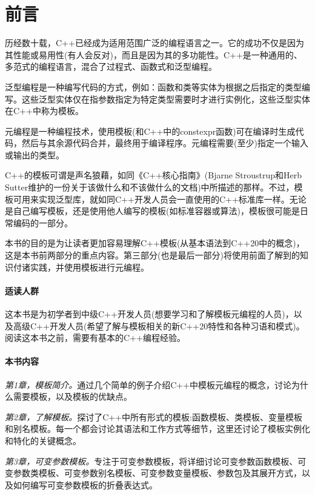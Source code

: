 \chapter{前言}

历经数十载，C++已经成为适用范围广泛的编程语言之一。它的成功不仅是因为其性能或易用性(有人会反对)，而且是因为其的多功能性。C++是一种通用的、多范式的编程语言，混合了过程式、函数式和泛型编程。

泛型编程是一种编写代码的方式，例如：函数和类等实体为根据之后指定的类型编写。这些泛型实体仅在指参数指定为特定类型需要时才进行实例化，这些泛型实体在C++中称为模板。

元编程是一种编程技术，使用模板(和C++中的constexpr函数)可在编译时生成代码，然后与其余源代码合并，最终用于编译程序。元编程需要(至少)指定一个输入或输出的类型。

C++的模板可谓是声名狼藉，如同《C++核心指南》(Bjarne Stroustrup和Herb Sutter维护的一份关于该做什么和不该做什么的文档)中所描述的那样。不过，模板可用来实现泛型库，就如同C++开发人员会一直使用的C++标准库一样。无论是自己编写模板，还是使用他人编写的模板(如标准容器或算法)，模板很可能是日常编码的一部分。

本书的目的是为让读者更加容易理解C++模板(从基本语法到C++20中的概念)，这是本书前两部分的重点内容。第三部分(也是最后一部分)将使用前面了解到的知识付诸实践，并使用模板进行元编程。

\subsubsection{适读人群}

这本书是为初学者到中级C++开发人员(想要学习和了解模板元编程的人员)，以及高级C++开发人员(希望了解与模板相关的新C++20特性和各种习语和模式)。阅读这本书之前，需要有基本的C++编程经验。

\subsubsection{本书内容}

\textit{第1章，模板简介。}通过几个简单的例子介绍C++中模板元编程的概念，讨论为什么需要模板，以及模板的优缺点。

\textit{第2章，了解模板。}探讨了C++中所有形式的模板:函数模板、类模板、变量模板和别名模板。每一个都会讨论其语法和工作方式等细节，这里还讨论了模板实例化和特化的关键概念。

\textit{第3章，可变参数模板。}专注于可变参数模板，将详细讨论可变参数函数模板、可变参数类模板、可变参数别名模板、可变参数变量模板、参数包及其展开方式，以及如何编写可变参数模板的折叠表达式。

